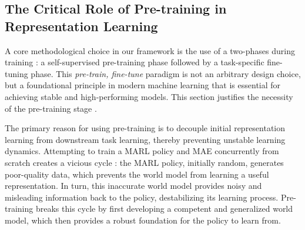 \subsection{The Critical Role of Pre-training in Representation Learning}
A core methodological choice in our framework is the use of a two-phases during  training : a self-supervised pre-training phase followed by a task-specific fine-tuning phase. This \textit{pre-train, fine-tune} paradigm is not an arbitrary design choice, but a foundational principle in modern machine learning that is essential for achieving stable and high-performing models. This section justifies the necessity of the pre-training stage .

The primary reason for using pre-training is to decouple initial representation learning from downstream task learning, thereby preventing unstable learning dynamics. Attempting to train a MARL policy and  MAE concurrently from scratch creates a vicious cycle : the MARL policy, initially random, generates poor-quality data, which prevents the world model from learning a useful representation. In turn, this inaccurate world model provides noisy and misleading information back to the policy, destabilizing its learning process. Pre-training breaks this cycle by first developing a competent and generalized world model, which then provides a robust foundation for the policy to learn from.

